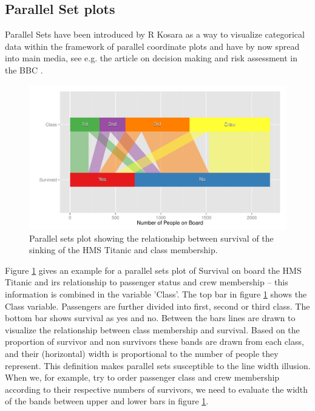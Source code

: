 \subsection{Parallel Set plots}


Parallel Sets have been introduced by R Kosara \citep{kosara:2006} as a way to visualize categorical data within the framework of parallel coordinate plots  and have by now spread into main media, see e.g. the article on decision making and risk assessment in the BBC \citep{bbc:2009}. 

\begin{figure}[hbtp]
\centering
\includegraphics[width=.9\linewidth]{images/parset-titanic}
\caption{\label{question1a} Parallel sets plot showing the relationship between survival of the sinking of the HMS Titanic and class membership. }
\end{figure}
Figure \ref{question1a} gives an example for a parallel sets plot of Survival on board the HMS Titanic  \citep{dawson:1995} and irs relationship to passenger status and crew membership -- this information is combined in the variable 'Class'.
 The top bar in figure \ref{question1a} shows the Class variable. Passengers are further divided into first, second or third class. The bottom bar shows survival  as yes and no. Between the bars lines are drawn to visualize the relationship between class membership and  survival. Based on the proportion of survivor and non survivors these bands are drawn from each class, and their (horizontal) width is proportional to the number of people they represent. 
This definition makes parallel sets susceptible to the line width illusion. When we, for example, try to order passenger class and crew membership according to their respective numbers of survivors, we need to evaluate the width of the bands between upper and lower bars in figure \ref{question1a}.
